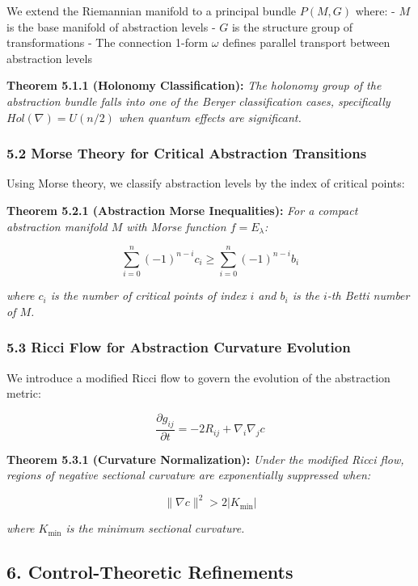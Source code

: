 \documentclass[
]{article}
\begin{document}
We extend the Riemannian manifold to a principal bundle \(P(M, G)\)
where: - \(M\) is the base manifold of abstraction levels - \(G\) is the
structure group of transformations - The connection 1-form \(\omega\)
defines parallel transport between abstraction levels

\textbf{Theorem 5.1.1 (Holonomy Classification):} \emph{The holonomy
group of the abstraction bundle falls into one of the Berger
classification cases, specifically \(Hol(\nabla) = U(n/2)\) when quantum
effects are significant.}

\subsubsection{5.2 Morse Theory for Critical Abstraction
Transitions}\label{morse-theory-for-critical-abstraction-transitions}

Using Morse theory, we classify abstraction levels by the index of
critical points:

\textbf{Theorem 5.2.1 (Abstraction Morse Inequalities):} \emph{For a
compact abstraction manifold \(M\) with Morse function
\(f = E_{\lambda}\):}

\[\sum_{i=0}^n (-1)^{n-i} c_i \geq \sum_{i=0}^n (-1)^{n-i} b_i\]

\emph{where \(c_i\) is the number of critical points of index \(i\) and
\(b_i\) is the \(i\)-th Betti number of \(M\).}

\subsubsection{5.3 Ricci Flow for Abstraction Curvature
Evolution}\label{ricci-flow-for-abstraction-curvature-evolution}

We introduce a modified Ricci flow to govern the evolution of the
abstraction metric:

\[\frac{\partial g_{ij}}{\partial t} = -2R_{ij} + \nabla_i \nabla_j c\]

\textbf{Theorem 5.3.1 (Curvature Normalization):} \emph{Under the
modified Ricci flow, regions of negative sectional curvature are
exponentially suppressed when:}

\[\|\nabla c\|^2 > 2|K_{\min}|\]

\emph{where \(K_{\min}\) is the minimum sectional curvature.}

\subsection{6. Control-Theoretic
Refinements}\label{control-theoretic-refinements}
\end{document}
